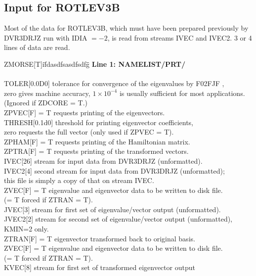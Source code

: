 \documentclass{elsart}
\begin{document}
\subsection{Input for ROTLEV3B}

Most of the data for ROTLEV3B, which must have been prepared previously by
DVR3DRJZ run with IDIA $= -2$, is read from streams IVEC and IVEC2. 3 or 4 lines
of data are read. \\
\begin{tabbing}
ZMORSE[T]i\=    fdasdfsasdfsdfg\=   \=             \kill
{\bf Line 1: NAMELIST/PRT/}\\
\\
TOLER[0.0D0] tolerance for convergence of the eigenvalues by F02FJF \cite{NAG},\\
\>  zero gives machine accuracy, $1 \times 10^{-4}$ is usually sufficient for
most applications.\\
\> (Ignored if ZDCORE = T.)\\
ZPVEC[F] \> = T requests printing of the eigenvectors.\\
THRESH[0.1d0] threshold for printing eigenvector coefficients,\\
\> zero requests the full vector (only used if ZPVEC = T).\\
ZPHAM[F] \> = T requests printing of the Hamiltonian matrix.\\
ZPTRA[F] \> = T requests printing of the transformed vectors.\\
IVEC[26]\> stream for input data from DVR3DRJZ (unformatted).\\
IVEC2[4]\> second stream for input data from DVR3DRJZ (unformatted);\\
        \> this file is simply a copy of that on stream IVEC.\\
ZVEC[F] \> = T eigenvalue and eigenvector data to be written to disk file.\\
        \> (= T forced if ZTRAN = T).\\
JVEC[3] \> stream for first set of eigenvalue/vector output
(unformatted).\\
JVEC2[2] \> stream for second set of eigenvalue/vector output
(unformatted), KMIN=2 only.\\
ZTRAN[F] \> = T eigenvector transformed back to original basis.\\
ZVEC[F] \> = T eigenvalue and eigenvector data to be written to disk file.\\
        \> (= T forced if ZTRAN = T).\\
KVEC[8] \> stream for first set of transformed eigenvector output

\end{tabbing}
\end{document}
